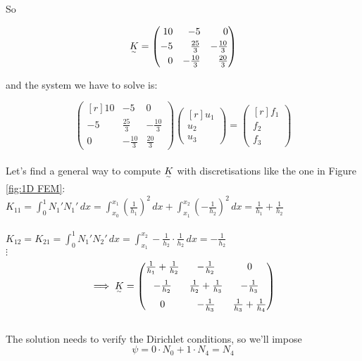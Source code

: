 \begin{example}
So 

\[
  \subTilde{K} =
  \begin{pmatrix*}[r]
    10 & -5            & 0\\[0.1cm]
    -5 & \frac{25}{3}  & -\frac{10}{3}\\[0.1cm]
    0  & -\frac{10}{3} & \frac{20}{3}
  \end{pmatrix*}
\]

and the system we have to solve is:

\[
  \begin{pmatrix*}[r]
    10 & -5            & 0\\[0.1cm]
    -5 & \frac{25}{3}  & -\frac{10}{3}\\[0.1cm]
    0  & -\frac{10}{3} & \frac{20}{3}
  \end{pmatrix*}
  \begin{pmatrix*}[r]
    u_1\\ u_2 \\ u_3
  \end{pmatrix*} =
  \begin{pmatrix*}[r]
    f_1\\f_2\\f_3
  \end{pmatrix*}
\]\-\\
Let's find a general way to compute $\underset{^\sim}{K}$ with discretisations like the one in Figure \ref{fig:1D FEM}:\\

$\displaystyle{K_{11} = \int_0^1 N_1'N_1' \, dx = \int_{x_0}^{x_1} \left(\frac{1}{h_1}\right)^2\,dx + \int_{x_1}^{x_2} \left(-\frac{1}{h_2}\right)^2\,dx = \frac{1}{h_1} + \frac{1}{h_2}}$ \\\-\\
$\displaystyle{K_{12} = K_{21} = \int_0^1 N_1'N_2' \, dx = \int_{x_1}^{x_2} -\frac{1}{h_2}\cdot \frac{1}{h_2}\,dx = -\frac{1}{h_2}}$ \\
$\vdots$
\[
  \implies 
  \subTilde{K} =
  \begin{pmatrix*}[c]
    \frac{1}{h_1} + \frac{1}{h_2} & -\frac{1}{h_2}                 & 0                             \\[0.25cm]
    -\frac{1}{h_2}                & \frac{1}{h_2} + \frac{1}{h_3}  & -\frac{1}{h_3}                \\[0.25cm]
    0                             & -\frac{1}{h_3}                 & \frac{1}{h_3} + \frac{1}{h_4}
  \end{pmatrix*}
\]\-\\
The solution needs to verify the Dirichlet conditions, so we'll impose $$\psi = 0\cdot N_0 + 1\cdot N_4 = N_4$$


\end{example}
